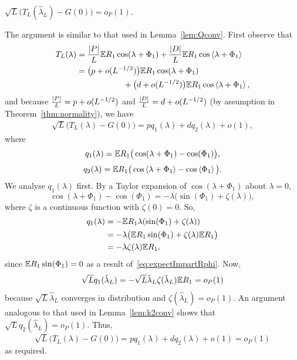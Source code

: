 \documentclass[journal]{IEEEtran}
\begin{document}
\begin{lemma}\label{lem:HLtoG} $\sqrt{L}\big( T_L(\hat{\lambda}_L) - G(0) \big) = o_P(1)$.
\end{lemma}
\begin{IEEEproof}
The argument is similar to that used in Lemma~\ref{lem:Qconv}.  First observe that
\begin{align*}
T_L(\lambda) &= \frac{{\vert P \vert}}{L}{\mathbb E} R_1\cos(\lambda + \Phi_1) + \frac{{\vert D \vert}}{L} {\mathbb E} R_1\cos\left\langle \lambda + \Phi_1 \right\rangle \\
&=  \big( p + o(L^{-1/2}) \big) {\mathbb E} R_1\cos(\lambda + \Phi_1) \\
&\hspace{2cm} + \big( d + o(L^{-1/2}) \big) {\mathbb E} R_1\cos\left\langle \lambda + \Phi_1 \right\rangle,
\end{align*}
and because $\tfrac{{\left\vert P \right\vert}}{L} = p + o(L^{-1/2})$ and $\tfrac{{\left\vert D \right\vert}}{L} = d + o(L^{-1/2})$ (by assumption in Theorem~\ref{thm:normality}), we have
\begin{align*}
\sqrt{L}\big( T_L(\lambda) - G(0) \big) = p q_1(\lambda) + d q_2(\lambda) + o(1),
\end{align*}
where
\[
q_1(\lambda) = {\mathbb E} R_1\big( \cos(\lambda + \Phi_1) - \cos(\Phi_1) \big),
\]
\begin{equation}
q_2(\lambda) = {\mathbb E} R_1\big( \cos\left\langle \lambda + \Phi_1 \right\rangle - \cos\left\langle \Phi_1 \right\rangle \big). \label{eq:q2def}
\end{equation}
We analyse $q_1(\lambda)$ first.  By a Taylor expansion of $\cos(\lambda + \Phi_1)$ about $\lambda = 0$,
\[
\cos(\lambda + \Phi_1) - \cos(\Phi_1) = -\lambda \big( \sin(\Phi_1) + \zeta(\lambda) \big),
\]
where $\zeta$ is a continuous function with $\zeta(0) = 0$. So,
\begin{align*}
q_1(\lambda) &= -{\mathbb E} R_1\lambda(\sin(\Phi_1) +  \zeta(\lambda)) \\
&= -\lambda \big( {\mathbb E} R_1\sin(\Phi_1) +  \zeta(\lambda) {\mathbb E} R_1 \big) \\
&= -\lambda \zeta(\lambda) {\mathbb E} R_1,
\end{align*}
since ${\mathbb E} R_1\sin(\Phi_1) = 0$ as a result of~\eqref{eq:expectImpartRphi}.  Now, 
\begin{align*}
\sqrt{L} q_1(\hat{\lambda}_L) = -\sqrt{L} \hat{\lambda}_L \zeta(\hat{\lambda}_L) {\mathbb E} R_1 = o_P(1)
\end{align*}
because $\sqrt{L} \hat{\lambda}_L$ converges in distribution and $\zeta(\hat{\lambda}_L) = o_P(1)$.  An argument analogous to that used in Lemma~\ref{lem:k2conv} shows that $\sqrt{L} q_2(\hat{\lambda}_L) = o_P(1)$.  Thus, 
\[
\sqrt{L}\big( T_L(\lambda) - G(0) \big) = p q_1(\lambda) + d q_2(\lambda) + o(1) = o_P(1)
\]
as required.
\end{IEEEproof}
\end{document}
